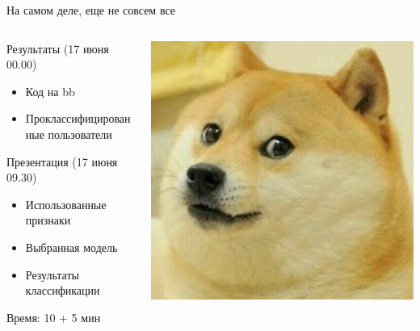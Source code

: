 \documentclass[10pt,a4paper]{beamer}
\begin{document}
\begin{frame}{На самом деле, еще не совсем все}

\begin{columns}[C]
    \begin{column}{.5\textwidth}
    Результаты (17 июня 00.00)
	\begin{itemize}
	\item Код на bb
	\item Проклассифицированные пользователи
	\end{itemize}
	Презентация (17 июня 09.30)
	\begin{itemize}
	\item Использованные признаки
	\item Выбранная модель
	\item Результаты классификации
	\end{itemize}
	Время: 10 + 5 мин
    \end{column}
    \begin{column}{.5\textwidth} 
	\begin{center}
	\includegraphics[scale=0.25]{images/doge.jpg}
	\end{center}  
    \end{column}
\end{columns}

\end{frame}
\end{document}
